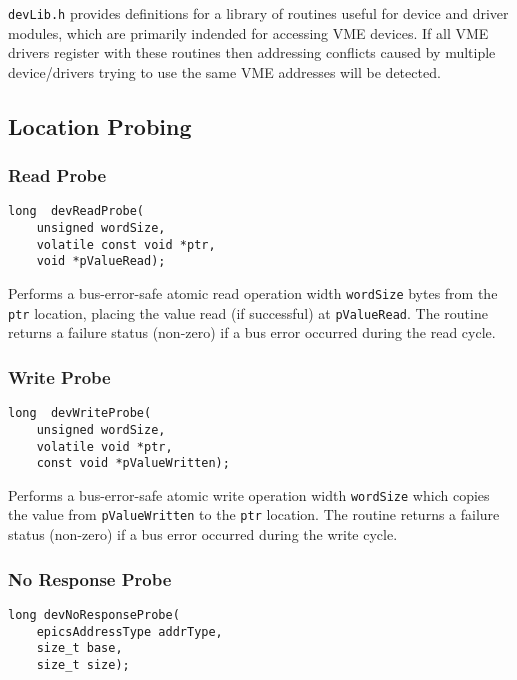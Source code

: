 \verb|devLib.h| provides definitions for a library of routines useful for device and driver modules, which are primarily 
indended for accessing VME devices. If all VME drivers register with these routines  then  addressing conflicts caused by 
multiple device/drivers trying to use the same VME addresses will be detected.

\subsection{Location Probing}

\subsubsection{Read Probe}

\begin{verbatim}
long  devReadProbe(
    unsigned wordSize,
    volatile const void *ptr,
    void *pValueRead);
\end{verbatim}

Performs a bus-error-safe atomic read operation width \verb|wordSize| bytes from the \verb|ptr| location, placing the value read (if 
successful) at \verb|pValueRead|. The routine returns a failure status (non-zero) if a bus error occurred during the read cycle.

\subsubsection{Write Probe}

\begin{verbatim}
long  devWriteProbe(
    unsigned wordSize,
    volatile void *ptr,
    const void *pValueWritten);
\end{verbatim}

Performs a bus-error-safe atomic write operation width \verb|wordSize| which copies the value from \verb|pValueWritten| to the 
\verb|ptr| location. The routine returns a failure status (non-zero) if a bus error occurred during the write cycle.

\subsubsection{No Response Probe}

\begin{verbatim}
long devNoResponseProbe(
    epicsAddressType addrType,
    size_t base,
    size_t size);
\end{verbatim}

